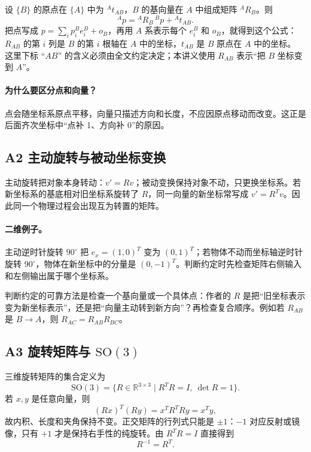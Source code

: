\documentclass[UTF8,a4paper,11pt]{ctexart}
\newcommand{\R}{\mathbb{R}}
\newcommand{\SO}{\mathrm{SO}(3)}
\begin{document}
设 $\{B\}$ 的原点在 $\{A\}$ 中为 ${}^A t_{AB}$，$B$ 的基向量在 $A$ 中组成矩阵 ${}^A R_B$。则
\[
{}^A p = {}^A R_B\,{}^B p + {}^A t_{AB}.
\]
把点写成 $p=\sum_i p_i^B e_i^B+o_B$，再用 $A$ 系表示每个 $e_i^B$ 和 $o_B$，就得到这个公式：$R_{AB}$ 的第 $i$ 列是 $B$ 的第 $i$ 根轴在 $A$ 中的坐标，$t_{AB}$ 是 $B$ 原点在 $A$ 中的坐标。
这里下标 ``$AB$'' 的含义必须由全文约定决定；本讲义使用 $R_{AB}$ 表示“把 $B$ 坐标变到 $A$”。

\paragraph{为什么要区分点和向量？}点会随坐标系原点平移，向量只描述方向和长度，不应因原点移动而改变。这正是后面齐次坐标中“点补 1、方向补 0”的原因。

\subsection{A2 主动旋转与被动坐标变换}
主动旋转把对象本身转动：$v'=Rv$；被动变换保持对象不动，只更换坐标系。若新坐标系的基底相对旧坐标系旋转了 $R$，同一向量的新坐标常写成 $v'=R^T v$。因此同一个物理过程会出现互为转置的矩阵。

\paragraph{二维例子。}主动逆时针旋转 $90^\circ$ 把 $e_x=(1,0)^T$ 变为 $(0,1)^T$；若物体不动而坐标轴逆时针旋转 $90^\circ$，物体在新坐标中的分量是 $(0,-1)^T$。判断约定时先检查矩阵右侧输入和左侧输出属于哪个坐标系。

判断约定的可靠方法是检查一个基向量或一个具体点：作者的 $R$ 是把“旧坐标表示变为新坐标表示”，还是把“向量主动转到新方向”？再检查复合顺序。例如若 $R_{AB}$ 是 $B\to A$，则 $R_{AC}=R_{AB}R_{BC}$。

\subsection{A3 旋转矩阵与 \texorpdfstring{$\SO$}{SO(3)}}
三维旋转矩阵的集合定义为
\[
\SO=\{R\in\R^{3\times3}\mid R^TR=I,\ \det R=1\}.
\]
若 $x,y$ 是任意向量，则
\[
(Rx)^T(Ry)=x^TR^TRy=x^Ty,
\]
故内积、长度和夹角保持不变。正交矩阵的行列式只能是 $\pm1$：$-1$ 对应反射或镜像，只有 $+1$ 才是保持右手性的纯旋转。由 $R^TR=I$ 直接得到
\[
R^{-1}=R^T.
\]
\end{document}
